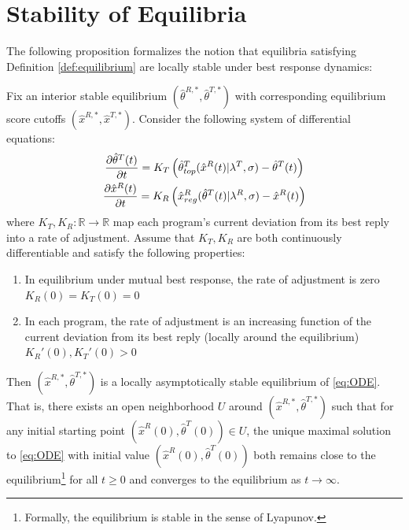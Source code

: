\newpage
\section{Stability of Equilibria}


\noindent The following proposition formalizes the notion that equilibria satisfying Definition \ref{def:equilibrium} are locally stable under best response dynamics:

\begin{proposition}\label{prop:local_asymptotic_stabilty} Fix an interior stable equilibrium $(\hat{\theta}^{R,*},\hat{\theta}^{T,*})$ with corresponding equilibrium score cutoffs $(\hat{x}^{R,*},\hat{x}^{T,*} )$. Consider the following system of differential equations:
\begin{gather}\label{eq:ODE}
    \dfrac{\partial \hat{\theta}^T(t)}{\partial t} = K_T\left(\hat{\theta}^T_{top}(\hat{x}^R(t)|\lambda^T,\sigma) - \hat{\theta}^{T}(t)\right) \\
    \dfrac{\partial \hat{x}^R(t)}{\partial t} = K_R\left(\hat{x}^R_{reg}(\hat{\theta}^T(t)|\lambda^R,\sigma) - \hat{x}^R(t)\right) \notag
\end{gather}
where $K_T,K_R:\mathbb{R}\rightarrow \mathbb{R}$ map each program's current deviation from its best reply into a rate of adjustment. Assume that $K_T,K_R$ are both continuously differentiable and satisfy the following properties:
\vspace{-5pt}
\begin{enumerate}[label=(\arabic*),ref=\theproposition(\arabic*)]
  \item In equilibrium under mutual best response, the rate of adjustment is zero $K_{R}(0) = K_{T}(0) = 0$
  \item In each program, the rate of adjustment is an increasing function of the current deviation from its best reply (locally around the equilibrium) $K_{R}'(0),K_{T}'(0)>0$
\end{enumerate}
Then $(\hat{x}^{R,*}, \hat{\theta}^{T,*})$ is a locally asymptotically stable equilibrium of \eqref{eq:ODE}. That is, there exists an open neighborhood $U$ around $(\hat{x}^{R,*}, \hat{\theta}^{T,*})$ such that for any initial starting point $(\hat{x}^R(0),\hat{\theta}^T(0))\in U$, the unique maximal solution to \eqref{eq:ODE} with initial value $(\hat{x}^R(0),\hat{\theta}^T(0))$ both remains close to the equilibrium\footnote{Formally, the equilibrium is stable in the sense of Lyapunov.} for all $t\geq 0$ and converges to the equilibrium as $t\rightarrow \infty$.
\end{proposition}



